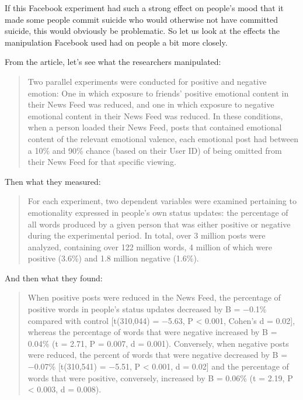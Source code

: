 \documentclass[
]{krantz}
\begin{document}
If this Facebook experiment had such a strong effect on people's mood that it made some people commit suicide who would otherwise not have committed suicide, this would obviously be problematic. So let us look at the effects the manipulation Facebook used had on people a bit more closely.

From the article, let's see what the researchers manipulated:

\begin{quote}
Two parallel experiments were conducted for positive and negative emotion: One in which exposure to friends' positive emotional content in their News Feed was reduced, and one in which exposure to negative emotional content in their News Feed was reduced. In these conditions, when a person loaded their News Feed, posts that contained emotional content of the relevant emotional valence, each emotional post had between a 10\% and 90\% chance (based on their User ID) of being omitted from their News Feed for that specific viewing.
\end{quote}

Then what they measured:

\begin{quote}
For each experiment, two dependent variables were examined pertaining to emotionality expressed in people's own status updates: the percentage of all words produced by a given person that was either positive or negative during the experimental period. In total, over 3 million posts were analyzed, containing over 122 million words, 4 million of which were positive (3.6\%) and 1.8 million negative (1.6\%).
\end{quote}

And then what they found:

\begin{quote}
When positive posts were reduced in the News Feed, the percentage of positive words in people's status updates decreased by B = −0.1\% compared with control {[}t(310,044) = −5.63, P \textless{} 0.001, Cohen's d = 0.02{]}, whereas the percentage of words that were negative increased by B = 0.04\% (t = 2.71, P = 0.007, d = 0.001). Conversely, when negative posts were reduced, the percent of words that were negative decreased by B = −0.07\% {[}t(310,541) = −5.51, P \textless{} 0.001, d = 0.02{]} and the percentage of words that were positive, conversely, increased by B = 0.06\% (t = 2.19, P \textless{} 0.003, d = 0.008).
\end{quote}
\end{document}
